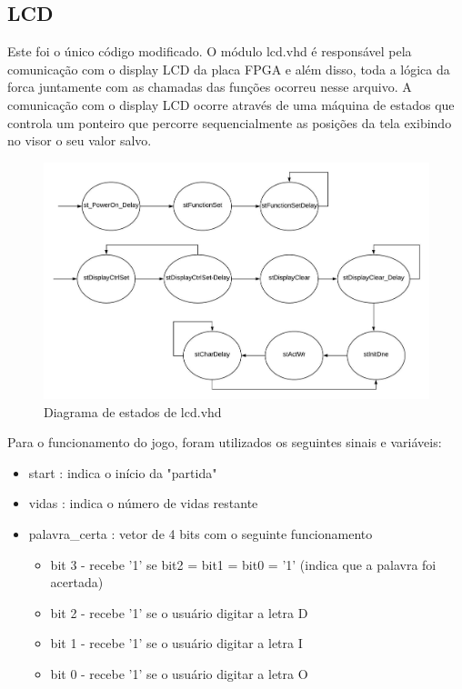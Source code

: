 \documentclass[a4paper,12pt,twoside]{article}
\begin{document}
\subsection{LCD}

Este foi o único código modificado. O módulo lcd.vhd é responsável pela comunicação com o display LCD da placa FPGA e além disso, toda a lógica da forca juntamente com as chamadas das funções ocorreu nesse arquivo.
A comunicação com o display LCD ocorre através de uma máquina de estados que controla um ponteiro que percorre sequencialmente as posições da tela exibindo no visor o seu valor salvo.
\newline
\begin{figure}[H]
\centering
\includegraphics[scale=0.7]{lcd.jpeg}
\caption{Diagrama de estados de lcd.vhd}
\label{fig:lcd}
\end{figure}


Para o funcionamento do jogo, foram utilizados os seguintes sinais e variáveis:\newline
 \begin{itemize}
   \item start : indica o início da "partida" 
   \item vidas : indica o número de vidas restante
   \item palavra\_certa : vetor de 4 bits com o seguinte funcionamento
                    \begin{itemize}
                    \item bit 3 - recebe '1' se bit2 = bit1 = bit0 = '1' (indica que a palavra foi acertada)
                    \item bit 2 - recebe '1' se o usuário digitar a letra D
                    \item bit 1 - recebe '1' se o usuário digitar a letra I
                    \item bit 0 - recebe '1' se o usuário digitar a letra O
                    \end{itemize}
 \end{itemize}
\end{document}
